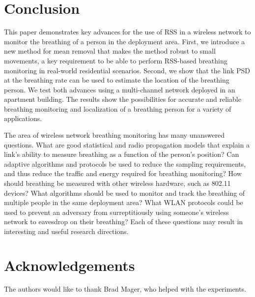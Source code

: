 \documentclass[10pt,journal,letterpaper]{IEEEtran}
\begin{document}
\section{Conclusion} \label{S:Conclusion}

This paper demonstrates key advances for the use of RSS in a wireless network to monitor the breathing of a person in the deployment area.  First, we introduce a new method for mean removal that makes the method robust to small movements, a key requirement to be able to perform RSS-based breathing monitoring in real-world residential scenarios.  Second, we show that the link PSD at the breathing rate can be used to estimate the location of the breathing person.  We test both advances using a multi-channel network deployed in an apartment building.  The results show the possibilities for accurate and reliable breathing monitoring and localization of a breathing person for a variety of applications.  

The area of wireless network breathing monitoring has many unanswered questions.  What are good statistical and radio propagation models that explain a link's ability to measure breathing as a function of the person's position?  Can adaptive algorithms and protocols be used to reduce the sampling requirements, and thus reduce the traffic and energy required for breathing monitoring?  How should breathing be measured with other wireless hardware, such as 802.11 devices?  What algorithms should be used to monitor and track the breathing of multiple people in the same deployment area?  What WLAN protocols could be used to prevent an adversary from surreptitiously using someone's wireless network to eavesdrop on their breathing?  Each of these questions may result in interesting and useful research directions.

\section*{Acknowledgements}
The authors would like to thank Brad Mager, who helped with the experiments.
\end{document}
